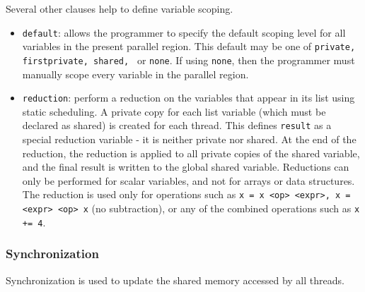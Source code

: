 \documentclass[10pt]{article}
\begin{document}
\begin{flushleft}
Several other clauses help to define variable scoping.

\begin{itemize}
\item {\tt default}: allows the programmer to specify the default scoping level for all variables in the present parallel region. This default may be one of {\tt private, firstprivate, shared, } or {\tt none}. If using {\tt none}, then the programmer must manually scope every variable in the parallel region.
\item {\tt reduction}: perform a reduction on the variables that appear in its list using static scheduling. A private copy for each list variable (which must be declared as shared) is created for each thread. This defines {\tt result} as a special reduction variable - it is neither private nor shared. At the end of the reduction, the reduction is applied to all private copies of the shared variable, and the final result is written to the global shared variable. Reductions can only be performed for scalar variables, and not for arrays or data structures. The reduction is used only for operations such as {\tt x = x <op> <expr>, x = <expr> <op> x} (no subtraction), or any of the combined operations such as {\tt x += 4}. 
\end{itemize}

\subsubsection{Synchronization}
Synchronization is used to update the shared memory accessed by all threads. 


\end{flushleft}
\end{document}
